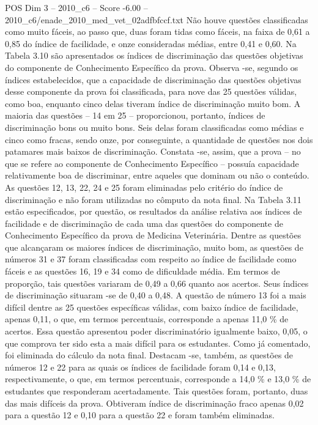 \begin{textsample}{POS Dim 3 – 2010\_c6 – Score -6.00 – 2010\_c6/enade\_2010\_med\_vet\_02adfbfccf.txt}
Não houve questões classificadas como muito fáceis, ao passo que, duas foram tidas como fáceis, na faixa de 0,61 a 0,85 do índice de facilidade, e onze consideradas médias, entre 0,41 e 0,60.
Na Tabela 3.10 são apresentados os índices de discriminação das questões objetivas do componente de Conhecimento Específico da prova.
Observa -se, segundo os índices estabelecidos, que a capacidade de discriminação das questões objetivas desse componente da prova foi classificada, para nove das 25 questões válidas, como boa, enquanto cinco delas tiveram índice de discriminação muito bom.
A maioria das questões – 14 em 25 – proporcionou, portanto, índices de discriminação bons ou muito bons.
Seis delas foram classificadas como médias e cinco como fracas, sendo onze, por conseguinte, a quantidade de questões nos dois patamares mais baixos de discriminação.
Constata -se, assim, que a prova – no que se refere ao componente de Conhecimento Específico – possuía capacidade relativamente boa de discriminar, entre aqueles que dominam ou não o conteúdo.
As questões 12, 13, 22, 24 e 25 foram eliminadas pelo critério do índice de discriminação e não foram utilizadas no cômputo da nota final.
Na Tabela 3.11 estão especificados, por questão, os resultados da análise relativa aos índices de facilidade e de discriminação de cada uma das questões do componente de Conhecimento Específico da prova de Medicina Veterinária.
Dentre as questões que alcançaram os maiores índices de discriminação, muito bom, as questões de números 31 e 37 foram classificadas com respeito ao índice de facilidade como fáceis e as questões 16, 19 e 34 como de dificuldade média.
Em termos de proporção, tais questões variaram de 0,49 a 0,66 quanto aos acertos.
Seus índices de discriminação situaram -se de 0,40 a 0,48.
A questão de número 13 foi a mais difícil dentre as 25 questões específicas válidas, com baixo índice de facilidade, apenas 0,11, o que, em termos percentuais, corresponde a apenas 11,0 \% de acertos.
Essa questão apresentou poder discriminatório igualmente baixo, 0,05, o que comprova ter sido esta a mais difícil para os estudantes.
Como já comentado, foi eliminada do cálculo da nota final.
Destacam -se, também, as questões de números 12 e 22 para as quais os índices de facilidade foram 0,14 e 0,13, respectivamente, o que, em termos percentuais, corresponde a 14,0 \% e 13,0 \% de estudantes que responderam acertadamente.
Tais questões foram, portanto, duas das mais difíceis da prova.
Obtiveram índice de discriminação fraco apenas 0,02 para a questão 12 e 0,10 para a questão 22 e foram também eliminadas.

\end{textsample}

